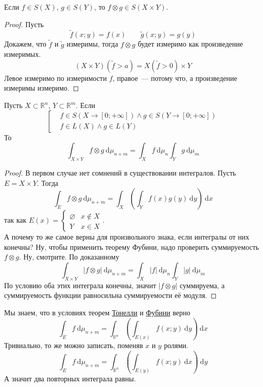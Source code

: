\documentclass{article}
\begin{document}
    \begin{lemma}
        Если $f\in S(X)$, $g\in S(Y)$, то $f\otimes g\in S(X\times Y)$.
    \end{lemma}
    \begin{proof}
        Пусть
        $$
        \tilde f(x;y)=f(x)\qquad\tilde g(x;y)=g(y)
        $$
        Докажем, что $\tilde f$ и $\tilde g$ измеримы, тогда $f\otimes g$ будет измеримо как произведение измеримых.\\
        $$(X\times Y)(\tilde f>a)=X(\tilde f>0)\times Y$$
        Левое измеримо по измеримости $f$, правое~--- потому что, а произведение измеримы измеримо.
    \end{proof}
    \begin{corollary}
        Пусть $X\subset\mathbb R^n$, $Y\subset\mathbb R^m$. Если
        $$
        \left[\begin{aligned}
            &f\in S(X\to[0;+\infty])\land g\in S(Y\to[0;+\infty])\\
            &f\in L(X)\land g\in L(Y)
        \end{aligned}\right.
        $$
        То
        $$
        \int_{X\times Y}f\otimes g~\mathrm d\mu_{n+m}=\int_Xf~\mathrm d\mu_n\int_Yg~\mathrm d\mu_m
        $$
    \end{corollary}
    \begin{proof}
        В первом случае нет сомнений в существовании интегралов. Пусть $E=X\times Y$. Тогда
        $$
        \int_Ef\otimes g~\mathrm d\mu_{n+m}=\int_X\left(\int_Yf(x)g(y)~\mathrm dy\right)~\mathrm dx
        $$
        так как $E(x)=\begin{cases}
            \varnothing&x\notin X\\
            Y&x\in X
        \end{cases}$.\\
        А почему то же самое верны для произвольного знака, если интегралы от них конечны? Ну, чтобы применить теорему Фубини, надо проверить суммируемость $f\otimes g$. Ну, смотрите. По доказанному
        $$
        \int_{X\times Y}|f\otimes g|~\mathrm d\mu_{n+m}=\int_X|f|~\mathrm d\mu_n\int_Y|g|~\mathrm d\mu_m
        $$
        По условию оба этих интеграла конечны, значит $|f\otimes g|$ суммируема, а суммируемость функции равносильна суммируемости её модуля.
    \end{proof}
    \begin{remark}
        Мы знаем, что в условиях теорем \hyperref[Теорема Тонелли]{Тонелли} и \hyperref[Теорема Фубини]{Фубини} верно
        $$
        \int_E f~\mathrm d\mu_{n+m}=\int_{\mathbb R^n}\left(\int_{E(x)}f(x;y)~\mathrm dy\right)~\mathrm dx
        $$
        Тривиально, то же можно записать, поменяв $x$ и $y$ ролями.
        $$
        \int_E f~\mathrm d\mu_{n+m}=\int_{\mathbb R^n}\left(\int_{E(y)}f(x;y)~\mathrm dx\right)~\mathrm dy
        $$
        А значит два повторных интеграла равны.
    \end{remark}
\end{document}

